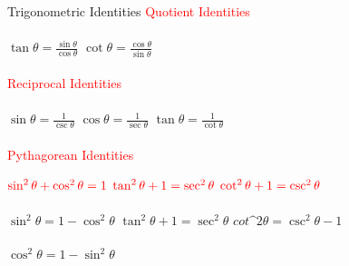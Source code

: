 \begin{frame}{Trigonometric Identities
}
\textcolor{red}{
Quotient Identities
 }
 \\
 \\
$\tan\theta = \frac{\sin\theta}{\cos\theta}$
\quad $\cot\theta = \frac{\cos\theta}{\sin\theta}$
\\
\\
\textcolor{red}{
Reciprocal Identities
 }
 \\
 \\
 $\sin\theta = \frac{1}{\csc\theta}$
\quad $\cos\theta = \frac{1}{\sec\theta}$
\quad $\tan\theta = \frac{1}{\cot\theta}$
\\
\\
\textcolor{red}{
Pythagorean Identities
 }
 
 $\color{red}\sin^2\theta + \cos^2\theta = 1$
 \quad $\color{red}\tan^2\theta + 1 = \sec^2\theta$
 \quad $\color{red}\cot^2\theta + 1 = \csc^2\theta$
 \\
 \\
 $\sin^2\theta = 1 - \cos^2\theta$
 \quad $\tan^2\theta + 1 = \sec^2\theta$
 \quad $cot\^2\theta = \csc^2\theta - 1$
 \\
 \\
 $\cos^2\theta = 1 - \sin^2\theta$
    
\end{frame}
